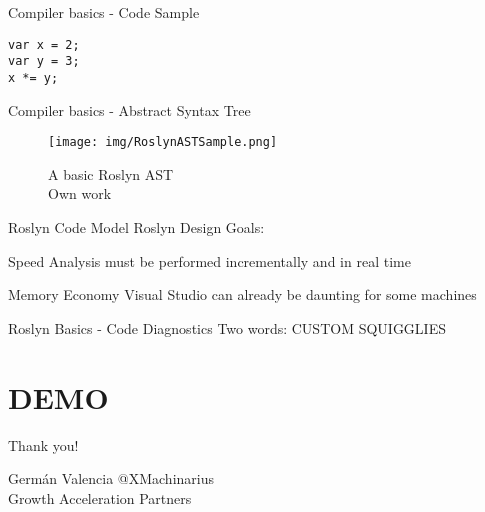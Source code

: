 \documentclass[10pt]{beamer}
\begin{document}
\begin{frame}[fragile]{Compiler basics - Code Sample}
\begin{verbatim}
var x = 2;
var y = 3;
x *= y;
\end{verbatim}
\end{frame}

\begin{frame}{Compiler basics - Abstract Syntax Tree}
    \begin{figure}
        \center
        \texttt{[image: img/RoslynASTSample.png]}
        \caption{A basic Roslyn AST \\ \tiny{Own work}}
    \end{figure}
\end{frame}

\begin{frame}{Roslyn Code Model}
Roslyn Design Goals:

\begin{block}{Speed}
    Analysis must be performed incrementally and in real time
\end{block}

\begin{block}{Memory Economy}
    Visual Studio can already be daunting for some machines
\end{block}
\end{frame}

\begin{frame}{Roslyn Basics - Code Diagnostics}
Two words: CUSTOM SQUIGGLIES
\end{frame}

\section{DEMO}

\begin{frame}{Thank you!}
\begin{block}{Germán Valencia}
    @XMachinarius \\ Growth Acceleration Partners
\end{block}
\end{frame}

{ %
    \begin{frame}[plain]
     \end{frame}
}
\end{document}
